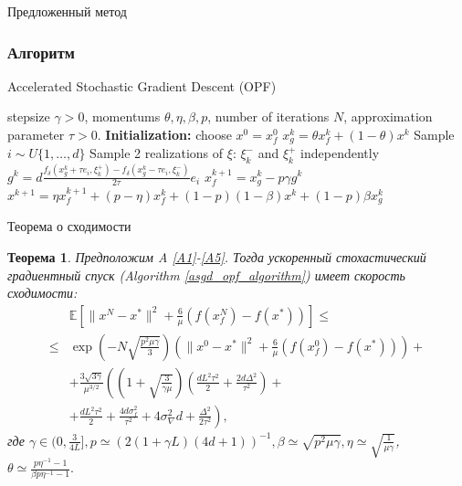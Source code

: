 \documentclass{beamer}
\newtheorem{theorem-ru}{Теорема}
\begin{document}
\begin{frame}{Предложенный метод}
\subsubsection{Алгоритм}
\begin{algorithm}[H]
\caption{ Accelerated Stochastic Gradient Descent (OPF) \label{asgd_opf_algorithm} }
\begin{algorithmic}[1]
   \Require stepsize $\gamma > 0$, momentums $\theta, \eta, \beta, p$, number of iterations $N$, approximation parameter $\tau > 0$.
   \State\textbf{Initialization:} choose $x^0 = x_f^0$
		\State $x_g^k = \theta x_f^k + (1 - \theta)x^k$
		\State Sample $i \sim U\{1, \dots, d\}$
        \State Sample 2 realizations of $\xi$: $\xi^-_k$ and $\xi^+_k$ independently
		\State $g^k = d\frac{f_\delta(x_g^k + \tau e_i, \xi^+_k) - f_\delta(x_g^k - \tau e_i, \xi^-_k)}{2\tau}e_i$
		\State $x_f^{k + 1} = x_g^k - p \gamma g^k$
		\State $x^{k + 1} = \eta x_f^{k + 1} + (p - \eta) x_f^k + (1 - p)(1 - \beta) x^k + (1 - p)\beta x_g^k$
   \EndFor
\end{algorithmic}
\end{algorithm}
\end{frame}


\begin{frame}{Теорема о сходимости}
 \begin{theorem-ru}\label{theorem2}
   Предположим A \ref{A1}-\ref{A5}. Тогда ускоренный стохастический градиентный спуск (Algorithm \ref{asgd_opf_algorithm}) имеет скорость сходимости:
   \begin{align*}
   &\mathbb{E}\left[\|x^N - x^*\|^2 + \frac{6}{\mu} (f(x_f^N) - f(x^*))\right] \leqslant \\
   \leqslant& \exp\left(- N\sqrt{\frac{p^2\mu\gamma}{3}}\right) \left(\|x^0 - x^*\|^2 + \frac{6}{\mu} (f(x_f^0) - f(x^*))\right) +\\
   &+ \frac{3 \sqrt{3\gamma}}{\mu^{3/2}} \left(\left(1 + \sqrt{\frac{3}{\gamma\mu}}\right) \left(\frac{d L^2 \tau^2}{2} + \frac{2d\Delta^2}{\tau^2}\right) +\right.\\
   &+\left.\frac{d L^2 \tau^2}{2} + \frac{4 d \sigma_f^2}{\tau^2} + 4 \sigma_\nabla^2 d + \frac{\Delta^2}{2\tau^2}\right),
   \label{stochastic_opf_convergence}
   \end{align*}
   где $\gamma \in (0, \frac{3}{4L}], p \simeq (2(1 + \gamma L)(4d + 1))^{-1}, \beta \simeq \sqrt{p^2 \mu \gamma}, \eta \simeq \sqrt{\frac{1}{\mu\gamma}}$, $\theta \simeq \frac{p \eta^{-1} - 1}{\beta p \eta^{-1} - 1}.$
\end{theorem-ru}
\end{frame}
\end{document}
